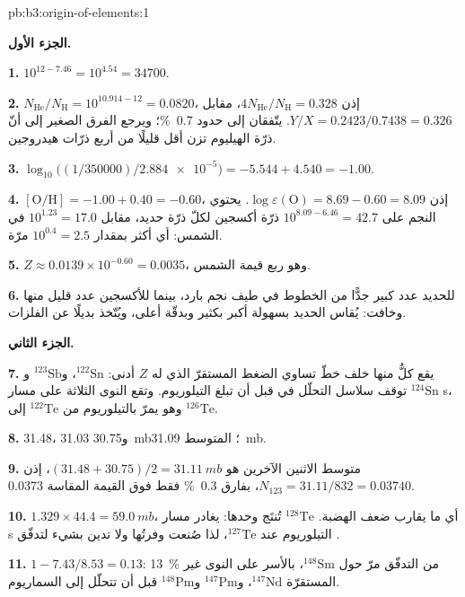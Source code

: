 \begin{solution}{pb:b3:origin-of-elements:1}

\textbf{الجزء الأول.}

\textbf{1.} $10^{12 - 7.46} = 10^{4.54} = \num{34700}$.

\textbf{2.} $N_\mathrm{He}/N_\mathrm{H} = 10^{10.914 - 12} = \num{0.0820}$، إذن
$4N_\mathrm{He}/N_\mathrm{H} = \num{0.328}$، مقابل $Y/X =
0.2423/0.7438 = \num{0.326}$. يتّفقان إلى حدود \qty{0.7}{\percent}؛ ويرجع
الفرق الصغير إلى أنّ ذرّة الهيليوم تزن أقل قليلًا من أربع
ذرّات هيدروجين.

\textbf{3.} $\log_{10}\bigl((1/350000)/\num{2.884e-5}\bigr) = -5.544 + 4.540 =
-1.00$.

\textbf{4.} $[\mathrm{O/H}] = -1.00 + 0.40 = -0.60$، إذن
$\log\varepsilon(\mathrm{O}) = 8.69 - 0.60 = 8.09$. يحتوي النجم على
$10^{8.09 - 6.46} = 42.7$ ذرّة أكسجين لكلّ ذرّة حديد، مقابل
$10^{1.23} = 17.0$ في الشمس: أي أكثر بمقدار $10^{0.4} = 2.5$ مرّة.

\textbf{5.} $Z \approx 0.0139\times10^{-0.60} = \num{0.0035}$، وهو ربع
قيمة الشمس.

\textbf{6.} للحديد عدد كبير جدًّا من الخطوط في طيف نجم بارد، بينما
للأكسجين عدد قليل منها وخافت: يُقاس الحديد بسهولة أكبر بكثير
وبدقّة أعلى، ويُتّخذ بديلًا عن الفلزات.

\textbf{الجزء الثاني.}

\textbf{7.} يقع كلٌّ منها خلف خطّ تساوي الضغط المستقرّ الذي له $Z$ أدنى:
$^{122}\mathrm{Sn}$، و$^{123}\mathrm{Sb}$ و$^{124}\mathrm{Sn}$ توقف
سلاسل التحلّل في  قبل أن تبلغ التيلوريوم. وتقع النوى الثلاثة
على مسار s، وهو يمرّ بالتيلوريوم من $^{122}\mathrm{Te}$ إلى
$^{126}\mathrm{Te}$.

\textbf{8.} \num{31.48}، \num{31.03} و\qty{30.75}{mb}؛ المتوسط
\qty{31.09}{mb}.

\textbf{9.} متوسط الاثنين الآخرين هو $(31.48 + 30.75)/2 = \qty{31.11}{mb}$،
إذن $N_{123} = 31.11/832 = \num{0.03740}$، بفارق \qty{0.3}{\percent} فقط
فوق القيمة المقاسة \num{0.0373}.

\textbf{10.} $1.329\times44.4 = \qty{59.0}{mb}$، أي ما يقارب ضعف الهضبة.
$^{128}\mathrm{Te}$ تُنتَج  وحدها: يغادر مسار s التيلوريوم عند
$^{127}\mathrm{Te}$، لذا صُنعت وفرتُها 
ولا تدين بشيء لتدفّق .

\textbf{11.} $1 - 7.43/8.53 = \num{0.13}$: \qty{13}{\percent} من التدفّق مرّ
حول $^{148}\mathrm{Sm}$، بالأسر على النوى غير المستقرّة
$^{147}\mathrm{Nd}$، و$^{147}\mathrm{Pm}$ و$^{148}\mathrm{Pm}$ قبل
أن تتحلّل إلى السماريوم.


\end{solution}
